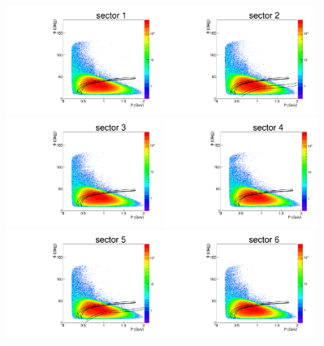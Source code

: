 \begin{figure}[htp]
\begin{center}
\begin{minipage}{.99\textwidth}
\begin{framed}
\end{framed}
\end{minipage}
\begin{minipage}{.99\textwidth}
\begin{framed}
\includegraphics[width=5cm]{pictures/other_cuts/fiduch/th_vs_p_p_sim/p_th_vs_p_sim_sector1.pdf}\includegraphics[width=5cm]{pictures/other_cuts/fiduch/th_vs_p_p_sim/p_th_vs_p_sim_sector2.pdf}\includegraphics[width=5cm]{pictures/other_cuts/fiduch/th_vs_p_p_sim/p_th_vs_p_sim_sector3.pdf}
\includegraphics[width=5cm]{pictures/other_cuts/fiduch/th_vs_p_p_sim/p_th_vs_p_sim_sector4.pdf}\includegraphics[width=5cm]{pictures/other_cuts/fiduch/th_vs_p_p_sim/p_th_vs_p_sim_sector5.pdf}\includegraphics[width=5cm]{pictures/other_cuts/fiduch/th_vs_p_p_sim/p_th_vs_p_sim_sector6.pdf}

\end{framed}
\end{minipage}
\end{center}
\end{figure}
